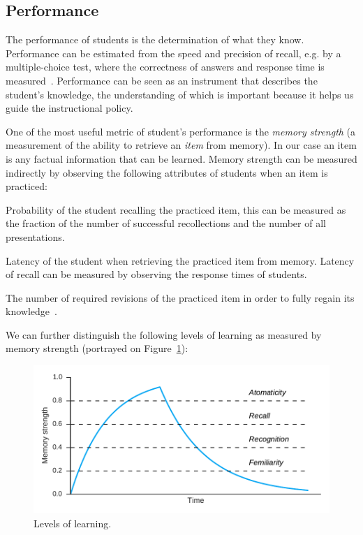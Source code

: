 \subsection{Performance}

The performance of students is the determination of what they know. Performance can be estimated from the speed and precision of recall, e.g. by a multiple-choice test, where the correctness of answers and response time is measured~\cite{Lewis}. Performance can be seen as an instrument that describes the student's knowledge, the understanding of which is important because it helps us guide the instructional policy.

One of the most useful metric of student's performance is the \textit{memory strength} (a measurement of the ability to retrieve an \textit{item} from memory). In our case an item is any factual information that can be learned. Memory strength can be measured indirectly by observing the following attributes of students when an item is practiced:

\begin{description}[leftmargin=0cm]
  \item[Probability of recall] Probability of the student recalling the practiced item, this can be measured as the fraction of the number of successful recollections and the number of all presentations.
  \item[Latency of recall] Latency of the student when retrieving the practiced item from memory. Latency of recall can be measured by observing the response times of students.
  \item[Savings in relearning] The number of required revisions of the practiced item in order to fully regain its knowledge~\cite{MichaelW.Eysenck2008}.
\end{description}

We can further distinguish the following levels of learning as measured by memory strength (portrayed on Figure~\ref{fig:knowledge-levels}):

\begin{figure}[htbp]
  \centering
  \includegraphics[width=\textwidth]{img/knowledge-levels}
  \caption{Levels of learning.}
  \label{fig:knowledge-levels}
\end{figure}

